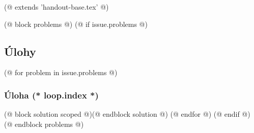 (@ extends 'handout-base.tex' @)

(@ block problems @)
    (@ if issue.problems @)
        \subsection{Úlohy}
        (@ for problem in issue.problems @)
            \subsubsection{Úloha (* loop.index *)}
            (@ block solution scoped @)(@ endblock solution @)
        (@ endfor @)
    (@ endif @)
(@ endblock problems @)
